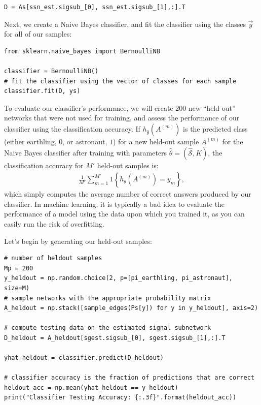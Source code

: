 \begin{lstlisting}[style=python]
D = As[ssn_est.sigsub_[0], ssn_est.sigsub_[1],:].T
\end{lstlisting}

Next, we create a Naive Bayes classifier, and fit the classifier using the classes $\vec y$ for all of our samples:

\begin{lstlisting}[style=python]
from sklearn.naive_bayes import BernoulliNB

classifier = BernoulliNB()
# fit the classifier using the vector of classes for each sample
classifier.fit(D, ys)
\end{lstlisting}

To evaluate our classifier's performance, we will create $200$ new ``held-out'' networks that were not used for training, and assess the performance of our classifier using the classification accuracy. If $h_{\hat\theta}\left(A^{(m)}\right)$ is the predicted class (either earthling, $0$, or astronaut, $1$) for a new held-out sample $A^{(m)}$ for the Naive Bayes classifier after training with parameters $\hat\theta = (\hat {\mathcal S}, K)$, the classification accuracy for $M'$ held-out samples is:
\begin{align*}
    \frac{1}{M'}\sum_{m = 1}^{M'}\mathfrak 1\left\{h_\theta\left(A^{(m)}\right) = y_m\right\},
\end{align*}
which simply computes the average number of correct answers produced by our classifier. In machine learning, it is typically a bad idea to evaluate the performance of a model using the data upon which you trained it, as you can easily run the risk of overfitting.

Let's begin by generating our held-out samples:

\begin{lstlisting}[style=python]
# number of heldout samples
Mp = 200
y_heldout = np.random.choice(2, p=[pi_earthling, pi_astronaut], size=M)
# sample networks with the appropriate probability matrix
A_heldout = np.stack([sample_edges(Ps[y]) for y in y_heldout], axis=2)

# compute testing data on the estimated signal subnetwork
D_heldout = A_heldout[sgest.sigsub_[0], sgest.sigsub_[1],:].T

yhat_heldout = classifier.predict(D_heldout)

# classifier accuracy is the fraction of predictions that are correct
heldout_acc = np.mean(yhat_heldout == y_heldout)
print("Classifier Testing Accuracy: {:.3f}".format(heldout_acc))
\end{lstlisting}

